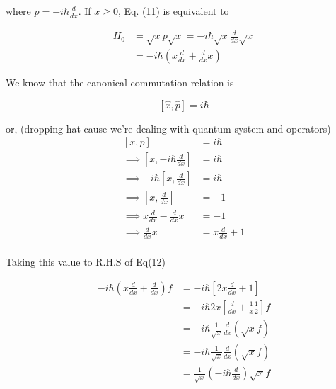 \documentclass[12pt]{report}
\newcommand*{\1}{\hspace{1pt}}
\begin{document}
        where $p = -i\hbar \frac{d}{dx}$. If $x\geqslant 0$, Eq. (11) is equivalent to

        \begin{equation}
            \begin{split}
                H_{0} &= \sqrt{x} p \sqrt{x} = -i\hbar \sqrt{x} \frac{d}{dx} \sqrt{x}\\ 
                &= -i\hbar\left(x\frac{d}{dx}+\frac{d}{dx}x\right)
            \end{split}
        \end{equation}

        We know that the canonical commutation relation is 
        
        \begin{equation}
            \left[\hat{x},\hat{p}\right] = i\hbar
        \end{equation}
        
        or, (dropping hat cause we're dealing with quantum system and operators)
        \begin{equation}
            \begin{split}
                \left[x,p\right] &= i\hbar \\ 
                \implies \left[x,-i\hbar\frac{d}{dx}\right] &= i\hbar \\
                \implies -i\hbar\left[x,\frac{d}{dx}\right] &= i\hbar \\
                \implies \left[x,\frac{d}{dx}\right] &= -1 \\
                \implies x\frac{d}{dx} - \frac{d}{dx}x &= -1 \\
                \implies  \frac{d}{dx}x &= x\frac{d}{dx} + 1 \\
            \end{split}
        \end{equation}

        Taking this value to R.H.S of Eq(12)

        \begin{equation}
            \begin{split}
                -i\hbar\left(x\frac{d}{dx} + \frac{d}{dx}\right)f &= -i\hbar\left[2x\frac{d}{dx}+1\right] \\ 
                & = -i\hbar2x\left[\frac{d}{dx}+\frac{1}{x}\frac{1}{2}\right]f \\ 
                & =  -i\hbar\frac{1}{\sqrt{x}}\frac{d}{dx}\left(\sqrt{x}f\right) \\ 
                & =  -i\hbar\frac{1}{\sqrt{x}}\frac{d}{dx}\left(\sqrt{x}f\right) \\ 
                & =  \frac{1}{\sqrt{x}}\left(-i\hbar\frac{d}{dx}\right)\sqrt{x}f \\ 
            \end{split}
        \end{equation}
\end{document}

